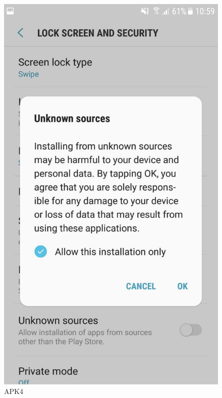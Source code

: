 \begin{figure}[h!]
\begin{minipage}[t]{0.48\textwidth}
\includegraphics[width=\linewidth,keepaspectratio=true]{img/apk4.jpg}
\caption{APK4}
\label{fig:APK4}
\end{minipage}
\end{figure}


